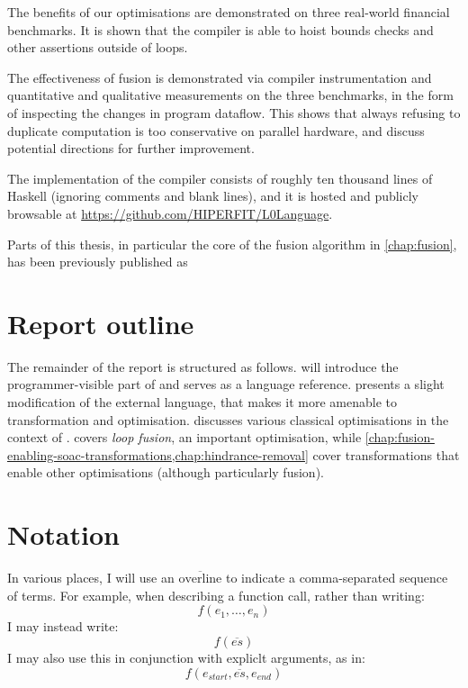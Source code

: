 The benefits of our optimisations are demonstrated on three real-world
financial benchmarks.  It is shown that the compiler is able to hoist
bounds checks and other assertions outside of loops.

The effectiveness of fusion is demonstrated via compiler
instrumentation and quantitative and qualitative measurements on the
three benchmarks, in the form of inspecting the changes in program
dataflow.  This shows that always refusing to duplicate computation is
too conservative on parallel hardware, and discuss potential
directions for further improvement.

The implementation of the \LO{} compiler consists of roughly ten
thousand lines of Haskell (ignoring comments and blank lines), and it
is hosted and publicly browsable at
\url{https://github.com/HIPERFIT/L0Language}.

Parts of this thesis, in particular the core of the fusion algorithm
in \cref{chap:fusion}, has been previously published as

\begin{quote}
\end{quote}

\section{Report outline}

The remainder of the report is structured as follows.
 will introduce the
programmer-visible part of \LO{} and serves as a language reference.
 presents a slight modification of the external
language, that makes it more amenable to transformation and
optimisation.   discusses various
classical optimisations in the context of \LO{}.  
covers \textit{loop fusion}, an important optimisation, while
\cref{chap:fusion-enabling-soac-transformations,chap:hindrance-removal}
cover transformations that enable other optimisations (although
particularly fusion).

\section{Notation}

In various places, I will use an \(\overline{\text{overline}}\) to
indicate a comma-separated sequence of terms.  For example, when
describing a function call, rather than writing:
\[
f(e_{1},\ldots,e_{n})
\]
I may instead write:
\[
f(\overline{es})
\]
I may also use this in conjunction with expliclt arguments, as in:
\[
f(e_{start},\overline{es},e_{end})
\]

